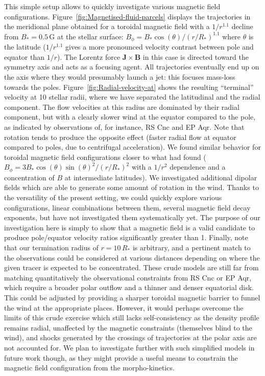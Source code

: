 \documentclass{aa}
\begin{document}
This simple setup allows to quickly investigate various magnetic field
configurations. Figure~\ref{fig:Magnetised-fluid-parcels} displays the
trajectories in the meridional plane obtained for a toroidal magnetic
field with a $1/r^{1.1}$ decline from $B_{*}=0.5$\,G at the stellar
surface: $B_{\phi}=B_{*}\cos(\theta)/(r/R_{*})^{1.1}$ where $\theta$
is the latitude ($1/r^{1.1}$ gives a more pronounced velocity contrast
between pole and equator than $1/r$). The Lorentz force
$\boldsymbol{J}\times\boldsymbol{B}$ in this case is directed toward
the symmetry axis and acts as a focusing agent. All trajectories
eventually end up on the axis where they would presumably launch a
jet: this focuses mass-loss towards the poles.
Figure~\ref{fig:Radial-velocity-at} shows the resulting ``terminal''
velocity at 10 stellar radii, where we have separated the latitudinal
and the radial component. The flow velocities at this radius are
dominated by their radial component, but with a clearly slower wind at
the equator compared to the pole, as indicated by observations of,
for instance, RS Cnc and EP Aqr. Note that rotation tends to produce the
opposite effect (faster radial flow at equator compared to poles, due
to centrifugal acceleration). We found similar behavior for toroidal
magnetic field configurations closer to what
\citet{2004ApJ...615..921M} had found
($B_{\phi}=3B_{*}\cos(\theta)\sin(\theta)^{2}/(r/R_{*})^{2}$ with a
$1/r^{2}$ dependence and a concentration of $B$ at intermediate
latitudes). We investigated additional dipolar fields which are able
to generate some amount of rotation in the wind. Thanks to the
versatility of the present setting, we could quickly explore various
configurations, linear combinations between them, several  magnetic
field decay exponents, but have not investigated them systematically
yet.  The purpose of our investigation here is simply to show that a
magnetic field is a valid candidate to produce pole/equator velocity
ratios significantly greater than 1. Finally, note that our
termination radius of $r=10\,R_{*}$ is arbitrary, and a pertinent
match to the observations could be considered at various distances
depending on where the given tracer is expected to be concentrated.
These crude models are still far from matching quantitatively the
observational constraints from RS Cnc or EP Aqr, which require a
broader polar outflow and a thinner and denser equatorial disk. This
could be adjusted by providing a sharper toroidal magnetic barrier to
funnel the wind at the appropriate places. However, it would perhaps
overcome the limits of this crude exercise which still lacks
self-consistency as the density profile remains radial, unaffected by
the magnetic constraints (themselves blind to the wind), and shocks
generated by the crossings of trajectories at the polar axis are not
accounted for. We plan to investigate further with such simplified
models in future work though, as they might provide a useful means to
constrain the magnetic field configuration from the morpho-kinetics.
\end{document}
